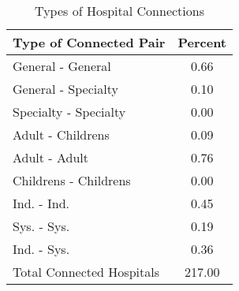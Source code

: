 \begin{table}[ht!]
\centering
\caption{Types of Hospital Connections}
\centering
\begin{tabular}[t]{lc}
\toprule
Type of Connected Pair & Percent\\
\midrule
General - General & 0.66\\
General - Specialty & 0.10\\
Specialty - Specialty & 0.00\\
Adult - Childrens & 0.09\\
Adult - Adult & 0.76\\
\addlinespace
Childrens - Childrens & 0.00\\
Ind. - Ind. & 0.45\\
Sys. - Sys. & 0.19\\
Ind. - Sys. & 0.36\\
Total Connected Hospitals & 217.00\\
\bottomrule
\end{tabular}
\end{table}

